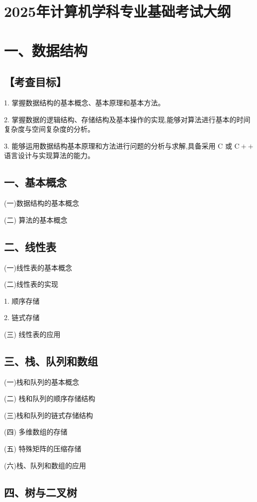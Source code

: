 \documentclass[10pt]{article}
\begin{document}
\section*{2025年计算机学科专业基础考试大纲}

\section*{一、数据结构}

\subsection*{【考查目标】}

1. 掌握数据结构的基本概念、基本原理和基本方法。

2. 掌握数据的逻辑结构、存储结构及基本操作的实现,能够对算法进行基本的时间复杂度与空间复杂度的分析。

3. 能够运用数据结构基本原理和方法进行问题的分析与求解,具备采用 \(\mathrm{C}\) 或 \(\mathrm{C} +  +\) 语言设计与实现算法的能力。

\subsection*{一、基本概念}

(一)数据结构的基本概念

(二) 算法的基本概念

\subsection*{二、线性表}

(一)线性表的基本概念 

(二)线性表的实现 

1. 顺序存储 

2. 链式存储 

(三) 线性表的应用

\subsection*{三、栈、队列和数组}

(一)栈和队列的基本概念

(二) 栈和队列的顺序存储结构

(三)栈和队列的链式存储结构

(四) 多维数组的存储

(五) 特殊矩阵的压缩存储

(六)栈、队列和数组的应用

\subsection*{四、树与二叉树}
\end{document}
